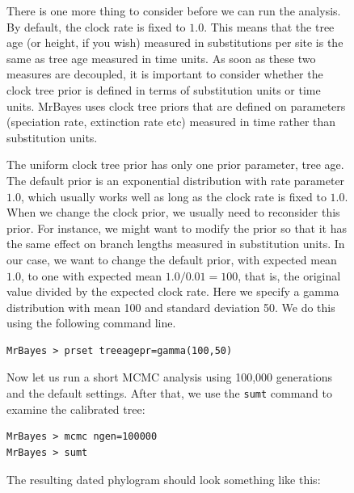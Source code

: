\documentclass[12pt]{book}
\newcommand{\ttt}[1]{\texttt{#1}}
\begin{document}
\begin{figure}[h]
There is one more thing to consider before we can run the analysis. By default, the clock rate is
fixed to $1.0$. This means that the tree age (or height, if you wish) measured in substitutions per
site is the same as tree age measured in time units. As soon as these two measures are decoupled,
it is important to consider whether the clock tree prior is defined in terms of substitution units
or time units. MrBayes uses clock tree priors that are defined on parameters (speciation rate,
extinction rate etc) measured in time rather than substitution units.

The uniform clock tree prior has only one prior parameter, tree age. The default prior is an
exponential distribution with rate parameter $1.0$, which usually works well as long as the clock
rate is fixed to $1.0$. When we change the clock prior, we usually need to reconsider this prior.
For instance, we might want to modify the prior so that it has the same effect on branch lengths
measured in substitution units. In our case, we want to change the default prior, with expected
mean $1.0$, to one with expected mean $1.0 / 0.01 = 100$, that is, the original value divided by
the expected clock rate. 
Here we specify a gamma distribution with mean 100 and standard deviation 50.
We do this using the following command line.

\small
\begin{singlespacing}
\begin{verbatim}
MrBayes > prset treeagepr=gamma(100,50)
\end{verbatim}
\end{singlespacing}
\normalsize

Now let us run a short MCMC analysis using 100,000 generations and the default settings. After
that, we use the \ttt{sumt} command to examine the calibrated tree:

\small
\begin{singlespacing}
\begin{verbatim}
MrBayes > mcmc ngen=100000
MrBayes > sumt
\end{verbatim}
\end{singlespacing}
\normalsize

The resulting dated phylogram should look something like this:


\end{figure}
\end{document}
